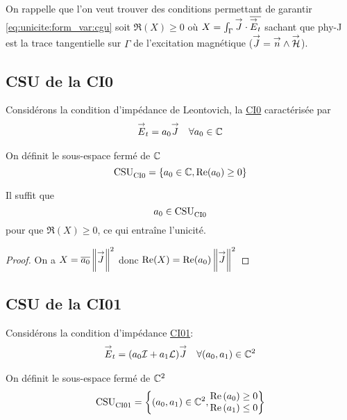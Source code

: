   On rappelle que l'on veut trouver des conditions permettant de garantir \eqref{eq:unicite:form_var:cgu} soit \(\Re(X)\ge0\) où \(X = \int_\Gamma {\overset{\rightarrow}{J}} \cdot {\overline{{\overset{\rightarrow}{E}}_t}}\) sachant que \gls{phy-J} est la trace tangentielle sur \(\Gamma\) de l’excitation magnétique (\({\overset{\rightarrow}{J}} = {\overset{\rightarrow}{n}} \wedge {\overset{\rightarrow}{\mathcal{H}}}\)).

  \subsection{CSU de la CI0}
    Considérons la condition d’impédance de Leontovich, la \hyperlink{ci0}{CI0} caractérisée par
    \begin{align}
      \label{eq:unicite:ci0}
      {\overset{\rightarrow}{E}}_t = a_0 {\overset{\rightarrow}{J}} && \forall a_0 \in \mathbb C
    \end{align}

    \begin{defn}
      \label{def:csu:ci0}
      On définit le sous-espace fermé de \(\mathbb C\)
      \begin{equation*}
        \operatorname{CSU}_{\operatorname{CI0}}^{{}} = \lbrace a_0 \in \mathbb C, \operatorname{Re}(a_0) \ge 0 \rbrace
      \end{equation*}
    \end{defn}

    \begin{prop}
      \label{prop:csu:ci0}
      Il suffit que
      \begin{equation*}
        a_0 \in \operatorname{CSU}_{\operatorname{CI0}}^{{}}
      \end{equation*}
      pour que \(\Re(X)\ge 0\), ce qui entraîne l'unicité.
    \end{prop}
    \begin{proof}
      On a \( X = {\overline{a_0}}\left\lVert{\overset{\rightarrow}{J}}\right\rVert^2\) donc \(\operatorname{Re}(X) = \operatorname{Re}(a_0)\left\lVert{\overset{\rightarrow}{J}}\right\rVert^2 \)
    \end{proof}
  \subsection{CSU de la CI01}
    Considérons la condition d’impédance \hyperlink{ci01}{CI01}:
    \begin{align}
      \label{eq:unicite:ci01}
      {\overset{\rightarrow}{E}}_t = (a_0{\mathcal{I}} + a_1 \mathcal{L}){\overset{\rightarrow}{J}} && \forall (a_0, a_1) \in \mathbb C^2
    \end{align}

    \begin{defn}
      \label{def:csu:ci01}
      On définit le sous-espace fermé de \(\mathbb C^2\)
      \begin{equation*}
        \operatorname{CSU}_{\operatorname{CI01}}^{{}} = \left\lbrace (a_0,a_1) \in \mathbb C^2,
        \begin{matrix}
        \operatorname{Re}\left(a_0\right) \ge 0
        \\
        \operatorname{Re}\left(a_1\right) \le 0
        \end{matrix}
        \right\rbrace
      \end{equation*}
    \end{defn}


